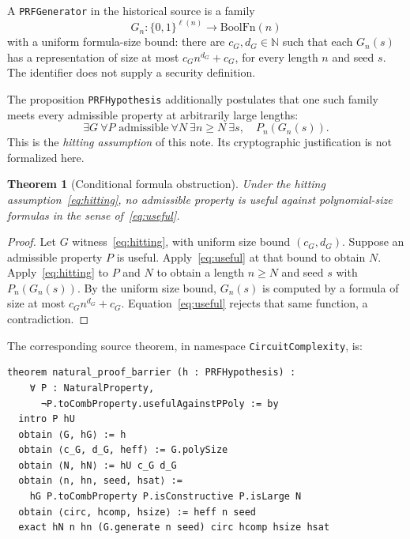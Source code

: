 \documentclass[11pt]{amsart}
\theoremstyle{plain}
\newtheorem{theorem}{Theorem}[section]
\theoremstyle{definition}
\begin{document}
A \texttt{PRFGenerator} in the historical source is a family
\[
 G_n:\{0,1\}^{\ell(n)}\longrightarrow \mathrm{BoolFn}(n)
\]
with a uniform formula-size bound: there are $c_G,d_G\in\mathbb N$
such that each $G_n(s)$ has a representation of size at most
$c_G n^{d_G}+c_G$, for every length $n$ and seed $s$.
The identifier does not supply a security definition.

The proposition \texttt{PRFHypothesis} additionally postulates that
one such family meets every admissible property at arbitrarily large
lengths:
\[
 \exists G\ \forall P\text{ admissible}\ \forall N\
 \exists n\ge N\ \exists s,\quad P_n(G_n(s)).
 \tag{2}\label{eq:hitting}
\]
This is the \emph{hitting assumption} of this note.
Its cryptographic justification is not formalized here.

\begin{theorem}[Conditional formula obstruction]

\label{thm:conditional}
Under the hitting assumption~\eqref{eq:hitting}, no admissible property
is useful against polynomial-size formulas in the sense
of~\eqref{eq:useful}.

\end{theorem}

\begin{proof}

Let $G$ witness~\eqref{eq:hitting}, with uniform size bound
$(c_G,d_G)$. Suppose an admissible property $P$ is useful.
Apply~\eqref{eq:useful} at that bound to obtain $N$.
Apply~\eqref{eq:hitting} to $P$ and $N$ to obtain a length $n\ge N$
and seed $s$ with $P_n(G_n(s))$. By the uniform size bound,
$G_n(s)$ is computed by a formula of size at most
$c_G n^{d_G}+c_G$. Equation~\eqref{eq:useful} rejects that same function,
a contradiction.

\end{proof}

The corresponding source theorem, in namespace
\texttt{CircuitComplexity}, is:
\begin{lstlisting}
theorem natural_proof_barrier (h : PRFHypothesis) :
    ∀ P : NaturalProperty,
      ¬P.toCombProperty.usefulAgainstPPoly := by
  intro P hU
  obtain ⟨G, hG⟩ := h
  obtain ⟨c_G, d_G, heff⟩ := G.polySize
  obtain ⟨N, hN⟩ := hU c_G d_G
  obtain ⟨n, hn, seed, hsat⟩ :=
    hG P.toCombProperty P.isConstructive P.isLarge N
  obtain ⟨circ, hcomp, hsize⟩ := heff n seed
  exact hN n hn (G.generate n seed) circ hcomp hsize hsat
\end{lstlisting}
\end{document}
